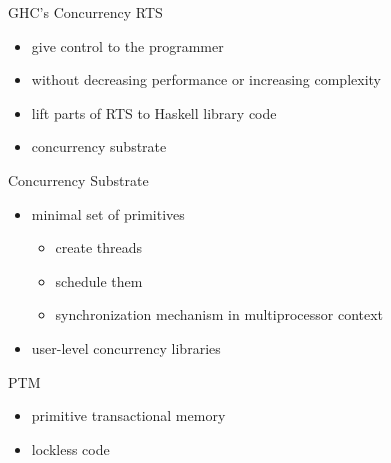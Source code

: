 \documentclass{beamer}
\begin{document}
\begin{frame}{GHC's Concurrency RTS}
  \begin{itemize}
    \item give control to the programmer
    \item without decreasing performance or increasing complexity
    \item lift parts of RTS to Haskell library code
    \item concurrency substrate
  \end{itemize}
\end{frame}


\begin{frame}{Concurrency Substrate}
  \begin{itemize}
    \item minimal set of primitives
    \begin{itemize}
      \item create threads
      \item schedule them
      \item synchronization mechanism in multiprocessor context
    \end{itemize}
    \pause
    \item user-level concurrency libraries
  \end{itemize}
\end{frame}

\begin{frame}{PTM}
  \begin{itemize}
    \item primitive transactional memory
    \item lockless code
  \end{itemize}
  
\end{frame}
\end{document}
